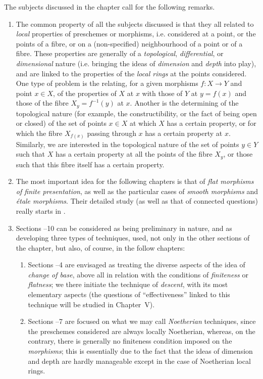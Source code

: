 The subjects discussed in the chapter call for the following remarks.
\begin{enumerate}
  \item[(a)] The common property of all the subjects discussed is that they all related to \emph{local} properties of preschemes or morphisms, i.e. considered at a point, or the points of a fibre, or on a (non-specified) neighbourhood of a point or of a fibre.
    These properties are generally of a \emph{topological}, \emph{differential}, or \emph{dimensional} nature (i.e. bringing the ideas of \emph{dimension} and \emph{depth} into play), and are linked to the properties of the \emph{local rings} at the points considered.
    One type of problem is the relating, for a given morphisms $f:X\to Y$ and point $x\in X$, of the properties of $X$ at $x$ with those of $Y$ at $y=f(x)$ and those of the fibre $X_y=f^{-1}(y)$ at $x$.
    Another is the determining of the topological nature (for example, the constructibility, or the fact of being open or closed) of the set of points $x\in X$ at which $X$ has a certain property, or for which the fibre $X_{f(x)}$ passing through $x$ has a certain property at $x$.
    Similarly, we are interested in the topological nature of the set of points $y\in Y$ such that $X$ has a certain property at all the points of the fibre $X_y$, or those such that this fibre itself has a certain property.
  \item[(b)] The most important idea for the following chapters is that of \emph{flat morphisms of finite presentation}, as well as the particular cases of \emph{smooth morphisms} and \emph{\'etale morphisms}.
    Their detailed study (as well as that of connected questions) really starts in .
  \item[(c)] Sections \textsection{}--10 can be considered as being preliminary in nature, and as developing three types of techniques, used, not only in the other sections of the chapter, but also, of course, in the follow chapters:
    \begin{enumerate}
      \item[(c1)] Sections \textsection{}--4 are envisaged as treating the diverse aspects of the idea of \emph{change of base}, above all in relation with the conditions of \emph{finiteness} or \emph{flatness}; we there initiate the technique of \emph{descent}, with its most elementary aspects (the questions of ``effectiveness'' linked to this technique will be studied in Chapter~V).
      \item[(c2)] Sections \textsection{}--7 are focused on what we may call \emph{Noetherian} techniques, since the preschemes considered are always locally Noetherian, whereas, on the contrary, there is generally no finiteness condition imposed on the \emph{morphisms}; this is essentially due to the fact that the ideas of dimension and depth are hardly manageable except in the case of Noetherian local rings.

\end{enumerate}
\end{enumerate}
